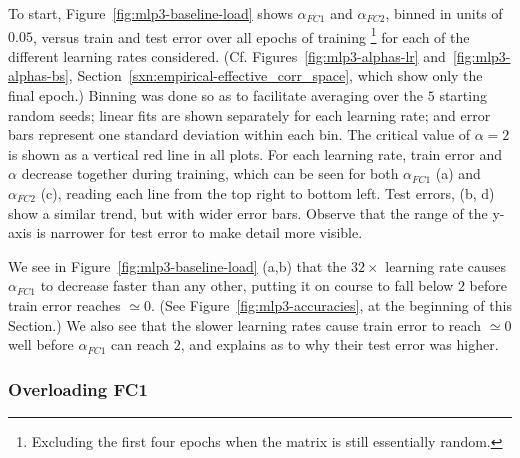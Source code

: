 To start, Figure~\ref{fig:mlp3-baseline-load} shows $\alpha_{FC1}$ and $\alpha_{FC2}$, binned in units of $0.05$, versus 
train and test error over all epochs of training
\footnote{Excluding the first four epochs when the matrix is still essentially random.} 
for each of the different learning rates considered. 
(Cf. Figures~\ref{fig:mlp3-alphas-lr} and~\ref{fig:mlp3-alphas-bs}, Section~\ref{sxn:empirical-effective_corr_space},
which show only the final epoch.)
Binning was done so as to facilitate averaging over the $5$ starting random seeds; 
linear fits are shown separately for each learning rate; and
error bars represent one standard deviation within each bin. 
The critical value of $\alpha=2$ is shown as a vertical red line in all plots. 
For each learning rate, train error and $\alpha$ decrease together during training, which can be seen for both 
$\alpha_{FC1}$ (a) and $\alpha_{FC2}$ (c), reading each line from the top right to bottom left. Test errors, (b, d) show 
a similar trend, but with wider error bars. 
Observe that the range of the y-axis is narrower for test error to make detail more visible.

We see in Figure~\ref{fig:mlp3-baseline-load} (a,b) 
that the $32\times$ learning rate causes $\alpha_{FC1}$ to decrease faster than any other, putting it on course to 
fall below $2$ before train error reaches $\simeq 0$. 
(See Figure~\ref{fig:mlp3-accuracies}, at the beginning of this Section.) 
We also see that the slower learning rates cause train error to reach $\simeq 0$ well before $\alpha_{FC1}$ can reach $2$, and explains as to why their test error was higher.



\subsubsection{Overloading FC1}
\label{sxn:hysteresis_effect_FC1}


